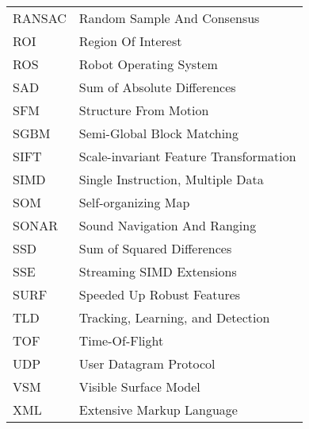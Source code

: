 \documentclass[12pt,a4paper,oneside,pdftex]{report}
\begin{document}
\begin{longtable}{@{}p{}p{}@{}}
RANSAC & Random Sample And Consensus \\
ROI & Region Of Interest \\
ROS & Robot Operating System \\
SAD & Sum of Absolute Differences \\
SFM & Structure From Motion \\
SGBM & Semi-Global Block Matching \\
SIFT & Scale-invariant Feature Transformation \\
SIMD & Single Instruction, Multiple Data \\
SOM & Self-organizing Map \\
SONAR & Sound Navigation And Ranging \\
SSD & Sum of Squared Differences \\
SSE & Streaming SIMD Extensions \\
SURF & Speeded Up Robust Features \\
TLD & Tracking, Learning, and Detection \\
TOF & Time-Of-Flight \\
UDP & User Datagram Protocol \\
VSM & Visible Surface Model \\
XML & Extensive Markup Language \\
\end{longtable}



\label{pages-prelude}
\cleardoublepage

\startfirstchapter

\pagestyle{headings}
\end{document}
